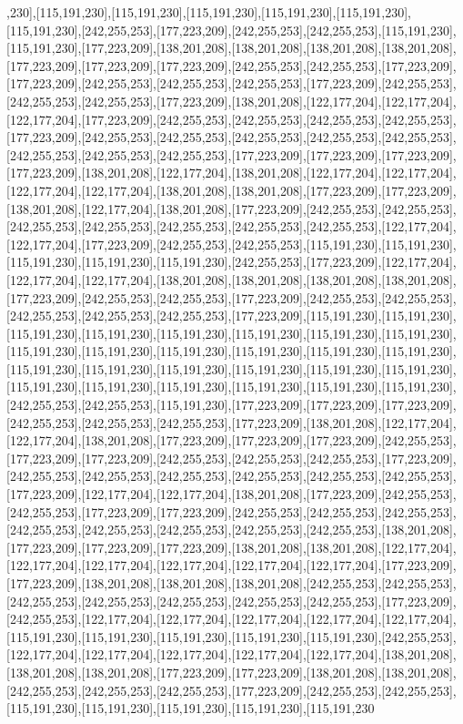 ,230],[115,191,230],[115,191,230],[115,191,230],[115,191,230],[115,191,230],[115,191,230],[242,255,253],[177,223,209],[242,255,253],[242,255,253],[115,191,230],[115,191,230],[177,223,209],[138,201,208],[138,201,208],[138,201,208],[138,201,208],[177,223,209],[177,223,209],[177,223,209],[242,255,253],[242,255,253],[177,223,209],[177,223,209],[242,255,253],[242,255,253],[242,255,253],[177,223,209],[242,255,253],[242,255,253],[242,255,253],[177,223,209],[138,201,208],[122,177,204],[122,177,204],[122,177,204],[177,223,209],[242,255,253],[242,255,253],[242,255,253],[242,255,253],[177,223,209],[242,255,253],[242,255,253],[242,255,253],[242,255,253],[242,255,253],[242,255,253],[242,255,253],[242,255,253],[177,223,209],[177,223,209],[177,223,209],[177,223,209],[138,201,208],[122,177,204],[138,201,208],[122,177,204],[122,177,204],[122,177,204],[122,177,204],[138,201,208],[138,201,208],[177,223,209],[177,223,209],[138,201,208],[122,177,204],[138,201,208],[177,223,209],[242,255,253],[242,255,253],[242,255,253],[242,255,253],[242,255,253],[242,255,253],[242,255,253],[122,177,204],[122,177,204],[177,223,209],[242,255,253],[242,255,253],[115,191,230],[115,191,230],[115,191,230],[115,191,230],[115,191,230],[242,255,253],[177,223,209],[122,177,204],[122,177,204],[122,177,204],[138,201,208],[138,201,208],[138,201,208],[138,201,208],[177,223,209],[242,255,253],[242,255,253],[177,223,209],[242,255,253],[242,255,253],[242,255,253],[242,255,253],[242,255,253],[177,223,209],[115,191,230],[115,191,230],[115,191,230],[115,191,230],[115,191,230],[115,191,230],[115,191,230],[115,191,230],[115,191,230],[115,191,230],[115,191,230],[115,191,230],[115,191,230],[115,191,230],[115,191,230],[115,191,230],[115,191,230],[115,191,230],[115,191,230],[115,191,230],[115,191,230],[115,191,230],[115,191,230],[115,191,230],[115,191,230],[115,191,230],[242,255,253],[242,255,253],[115,191,230],[177,223,209],[177,223,209],[177,223,209],[242,255,253],[242,255,253],[242,255,253],[177,223,209],[138,201,208],[122,177,204],[122,177,204],[138,201,208],[177,223,209],[177,223,209],[177,223,209],[242,255,253],[177,223,209],[177,223,209],[242,255,253],[242,255,253],[242,255,253],[177,223,209],[242,255,253],[242,255,253],[242,255,253],[242,255,253],[242,255,253],[242,255,253],[177,223,209],[122,177,204],[122,177,204],[138,201,208],[177,223,209],[242,255,253],[242,255,253],[177,223,209],[177,223,209],[242,255,253],[242,255,253],[242,255,253],[242,255,253],[242,255,253],[242,255,253],[242,255,253],[242,255,253],[138,201,208],[177,223,209],[177,223,209],[177,223,209],[138,201,208],[138,201,208],[122,177,204],[122,177,204],[122,177,204],[122,177,204],[122,177,204],[122,177,204],[177,223,209],[177,223,209],[138,201,208],[138,201,208],[138,201,208],[242,255,253],[242,255,253],[242,255,253],[242,255,253],[242,255,253],[242,255,253],[242,255,253],[177,223,209],[242,255,253],[122,177,204],[122,177,204],[122,177,204],[122,177,204],[122,177,204],[115,191,230],[115,191,230],[115,191,230],[115,191,230],[115,191,230],[242,255,253],[122,177,204],[122,177,204],[122,177,204],[122,177,204],[122,177,204],[138,201,208],[138,201,208],[138,201,208],[177,223,209],[177,223,209],[138,201,208],[138,201,208],[242,255,253],[242,255,253],[242,255,253],[177,223,209],[242,255,253],[242,255,253],[115,191,230],[115,191,230],[115,191,230],[115,191,230],[115,191,230